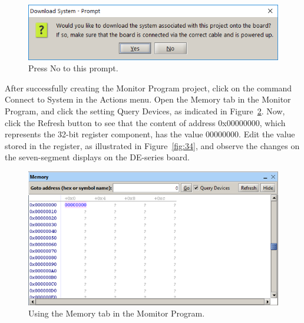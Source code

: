 \documentclass[11pt, twoside, pdftex]{article}
\begin{document}
\clearpage

\begin{figure}[H]
   \begin{center}
        \includegraphics[scale=0.8]{figures/figure32.png}
   \end{center}
   \caption{Press {\sf No} to this prompt.}
	\label{fig:32}
\end{figure}

After successfully creating the Monitor Program project, click on the 
command {\sf Connect to System} in the {\sf Actions} menu. 
Open the {\sf Memory} tab in the Monitor Program, and click the setting {\sf Query 
Devices}, as indicated in Figure~\ref{fig:33}. Now, click the {\sf Refresh} button to 
see that the content of address {\sf 0x00000000}, which represents the 32-bit register 
component, has the value 00000000. 
Edit the value stored in the register, as illustrated 
in Figure~\ref{fig:34}, and observe the changes on the seven-segment displays on the 
DE-series board.

\begin{figure}[H]
   \begin{center}
        \includegraphics[scale=0.75]{figures/figure33.png}
   \end{center}
   \caption{Using the {\sf Memory} tab in the Momitor Program.}
	\label{fig:33}
\end{figure}
\end{document}
